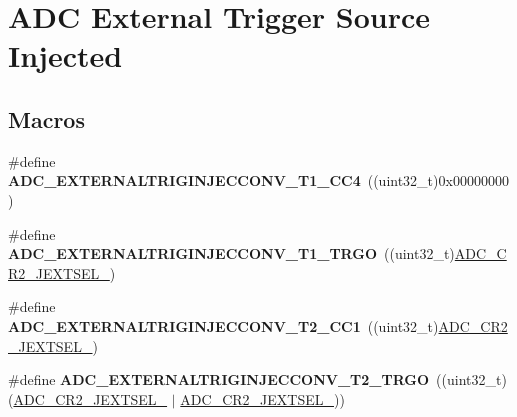 \hypertarget{group___a_d_c_ex___external__trigger___source___injected}{}\section{A\+DC External Trigger Source Injected}
\label{group___a_d_c_ex___external__trigger___source___injected}
\subsection*{Macros}
\begin{DoxyCompactItemize}
\item 
\#define {\bfseries A\+D\+C\+\_\+\+E\+X\+T\+E\+R\+N\+A\+L\+T\+R\+I\+G\+I\+N\+J\+E\+C\+C\+O\+N\+V\+\_\+\+T1\+\_\+\+C\+C4}~((uint32\+\_\+t)0x00000000)\hypertarget{group___a_d_c_ex___external__trigger___source___injected_ga50c7351afe9cf0960de8f2ae831d8a0b}{}\label{group___a_d_c_ex___external__trigger___source___injected_ga50c7351afe9cf0960de8f2ae831d8a0b}

\item 
\#define {\bfseries A\+D\+C\+\_\+\+E\+X\+T\+E\+R\+N\+A\+L\+T\+R\+I\+G\+I\+N\+J\+E\+C\+C\+O\+N\+V\+\_\+\+T1\+\_\+\+T\+R\+GO}~((uint32\+\_\+t)\hyperlink{group___peripheral___registers___bits___definition_gaa70c1f30e2101e2177ce564440203ba3}{A\+D\+C\+\_\+\+C\+R2\+\_\+\+J\+E\+X\+T\+S\+E\+L\+\_})\hypertarget{group___a_d_c_ex___external__trigger___source___injected_ga577c4e4b766688d873ab518fa4e8cef0}{}\label{group___a_d_c_ex___external__trigger___source___injected_ga577c4e4b766688d873ab518fa4e8cef0}

\item 
\#define {\bfseries A\+D\+C\+\_\+\+E\+X\+T\+E\+R\+N\+A\+L\+T\+R\+I\+G\+I\+N\+J\+E\+C\+C\+O\+N\+V\+\_\+\+T2\+\_\+\+C\+C1}~((uint32\+\_\+t)\hyperlink{group___peripheral___registers___bits___definition_ga99fa4a240d34ce231d6d0543bac7fd9b}{A\+D\+C\+\_\+\+C\+R2\+\_\+\+J\+E\+X\+T\+S\+E\+L\+\_})\hypertarget{group___a_d_c_ex___external__trigger___source___injected_gaadc7ecf196e883d7375e299dde80a8fa}{}\label{group___a_d_c_ex___external__trigger___source___injected_gaadc7ecf196e883d7375e299dde80a8fa}

\item 
\#define {\bfseries A\+D\+C\+\_\+\+E\+X\+T\+E\+R\+N\+A\+L\+T\+R\+I\+G\+I\+N\+J\+E\+C\+C\+O\+N\+V\+\_\+\+T2\+\_\+\+T\+R\+GO}~((uint32\+\_\+t)(\hyperlink{group___peripheral___registers___bits___definition_ga99fa4a240d34ce231d6d0543bac7fd9b}{A\+D\+C\+\_\+\+C\+R2\+\_\+\+J\+E\+X\+T\+S\+E\+L\+\_} $\vert$ \hyperlink{group___peripheral___registers___bits___definition_gaa70c1f30e2101e2177ce564440203ba3}{A\+D\+C\+\_\+\+C\+R2\+\_\+\+J\+E\+X\+T\+S\+E\+L\+\_}))\hypertarget{group___a_d_c_ex___external__trigger___source___injected_ga5408c05ebc9a0a16c08b0be0e79506dc}{}\label{group___a_d_c_ex___external__trigger___source___injected_ga5408c05ebc9a0a16c08b0be0e79506dc}


\end{DoxyCompactItemize}
